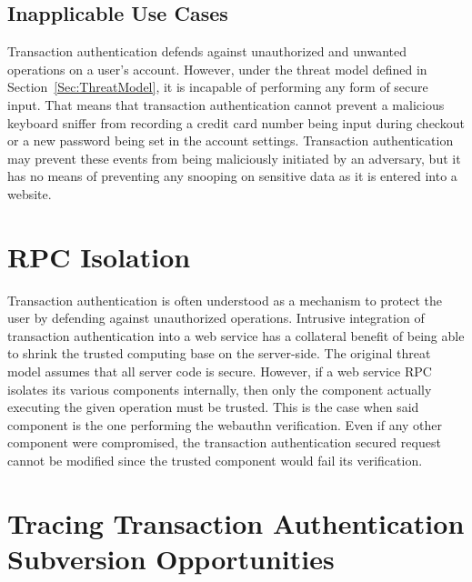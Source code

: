 
\subsection{Inapplicable Use Cases}

Transaction authentication defends against unauthorized and unwanted operations on a user's account. However, under the threat model defined in Section~\ref{Sec:ThreatModel}, it is incapable of performing any form of secure input. That means that transaction authentication cannot prevent a malicious keyboard sniffer from recording a credit card number being input during checkout or a new password being set in the account settings. Transaction authentication may prevent these events from being maliciously initiated by an adversary, but it has no means of preventing any snooping on sensitive data as it is entered into a website.

\section{RPC Isolation}

Transaction authentication is often understood as a mechanism to protect the user by defending against unauthorized operations. Intrusive integration of transaction authentication into a web service has a collateral benefit of being able to shrink the trusted computing base on the server-side. The original threat model assumes that all server code is secure. However, if a web service RPC isolates its various components internally, then only the component actually executing the given operation must be trusted. This is the case when said component is the one performing the webauthn verification. Even if any other component were compromised, the transaction authentication secured request cannot be modified since the trusted component would fail its verification.



\section{Tracing Transaction Authentication \newline Subversion Opportunities}

